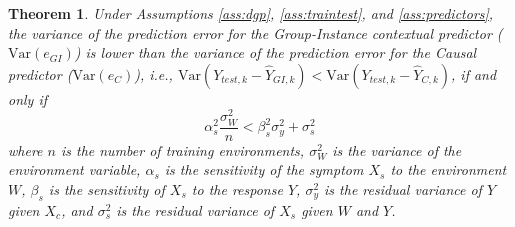 \documentclass{article}
\newtheorem{theorem}{Theorem}[section]
\theoremstyle{definition}
\theoremstyle{remark}
\newcommand{\Var}{\mathrm{Var}}
\begin{document}
\begin{theorem}
Under Assumptions \ref{ass:dgp}, \ref{ass:traintest}, and \ref{ass:predictors}, the variance of the prediction error for the Group-Instance contextual predictor ($\Var(e_{GI})$) is lower than the variance of the prediction error for the Causal predictor ($\Var(e_C)$), i.e., $\Var(Y_{test,k} - \hat{Y}_{GI,k}) < \Var(Y_{test,k} - \hat{Y}_{C,k})$, if and only if
\begin{equation}
\alpha_s^2 \frac{\sigma_W^2}{n} < \beta_s^2 \sigma_y^2 + \sigma_s^2
\end{equation}
where $n$ is the number of training environments, $\sigma_W^2$ is the variance of the environment variable, $\alpha_s$ is the sensitivity of the symptom $X_s$ to the environment $W$, $\beta_s$ is the sensitivity of $X_s$ to the response $Y$, $\sigma_y^2$ is the residual variance of $Y$ given $X_c$, and $\sigma_s^2$ is the residual variance of $X_s$ given $W$ and $Y$.
\end{theorem}
\end{document}
